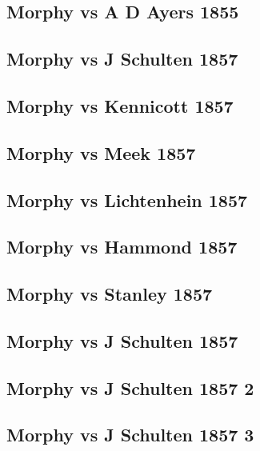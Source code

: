 \documentclass[]{book}
\begin{document}
\subsection{Morphy vs A D Ayers 1855}\label{morphy-vs-a-d-ayers-1855}

\subsection{Morphy vs J Schulten 1857}\label{morphy-vs-j-schulten-1857}

\subsection{Morphy vs Kennicott 1857}\label{morphy-vs-kennicott-1857}

\subsection{Morphy vs Meek 1857}\label{morphy-vs-meek-1857}

\subsection{Morphy vs Lichtenhein
1857}\label{morphy-vs-lichtenhein-1857}

\subsection{Morphy vs Hammond 1857}\label{morphy-vs-hammond-1857}

\subsection{Morphy vs Stanley 1857}\label{morphy-vs-stanley-1857}

\subsection{Morphy vs J Schulten
1857}\label{morphy-vs-j-schulten-1857-1}

\subsection{Morphy vs J Schulten 1857
2}\label{morphy-vs-j-schulten-1857-2}

\subsection{Morphy vs J Schulten 1857
3}\label{morphy-vs-j-schulten-1857-3}
\end{document}

